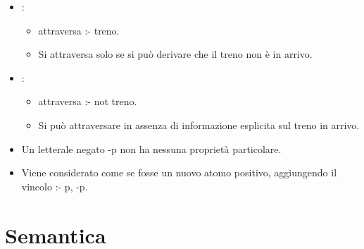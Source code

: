 \begin{itemize}
  \item {}: 
    \begin{itemize}
      \item attraversa :- treno. 
      \item Si attraversa solo se si può derivare che il treno non è in
arrivo.
    \end{itemize}
  \item {}: 
    \begin{itemize}
      \item attraversa :- not treno. 
      \item Si può attraversare in assenza di informazione esplicita sul treno in
arrivo.
    \end{itemize}
  \item Un letterale negato -p non ha nessuna proprietà particolare. 
  \item Viene considerato come se fosse un nuovo atomo positivo,
aggiungendo il vincolo :- p, -p.
\end{itemize}


\section{Semantica}





